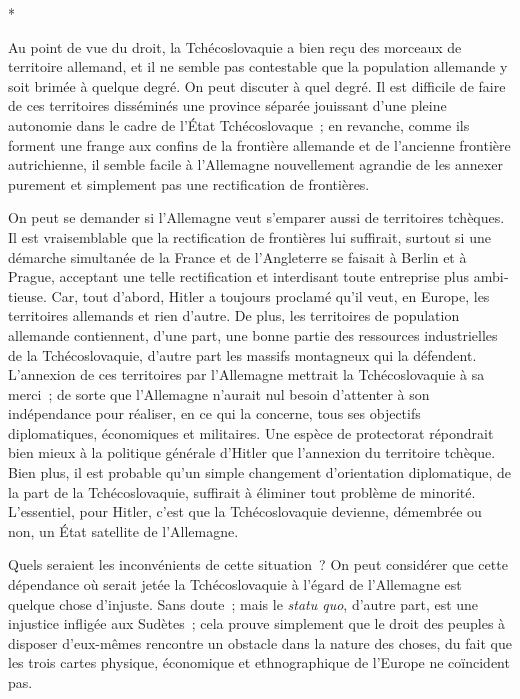 \documentclass[french,twoside]{book} %
\begin{document}
\begin{center}
*\end{center}
\noindent Au point de vue du droit, la Tchécoslovaquie a bien reçu des morceaux de territoire allemand, et il ne semble pas contestable que la population alleman­de y soit brimée à quelque degré. On peut discuter à quel degré. Il est difficile de faire de ces territoires disséminés une province séparée jouissant d'une pleine autonomie dans le cadre de l'État Tchécoslovaque ; en revanche, com­me ils forment une frange aux confins de la frontière allemande et de l'ancienne frontière autrichienne, il semble facile à l'Allemagne nouvellement agrandie de les annexer purement et simplement pas une rectification de frontières.\par
On peut se demander si l'Allemagne veut s'emparer aussi de territoires tchèques. Il est vraisemblable que la rectification de frontières lui suffirait, surtout si une démarche simultanée de la France et de l'Angleterre se faisait à Berlin et à Prague, acceptant une telle rectification et interdisant toute entre­prise plus ambi­tieuse. Car, tout d'abord, Hitler a toujours proclamé qu'il veut, en Europe, les territoires allemands et rien d'autre. De plus, les territoires de population allemande contiennent, d'une part, une bonne partie des ressources industrielles de la Tchécoslovaquie, d'autre part les massifs montagneux qui la défendent. L'annexion de ces territoires par l'Allemagne mettrait la Tchécos­lovaquie à sa merci ; de sorte que l'Allemagne n'aurait nul besoin d'attenter à son indépendance pour réaliser, en ce qui la concerne, tous ses objectifs diplomatiques, économiques et militaires. Une espèce de protectorat répon­drait bien mieux à la politique générale d'Hitler que l'annexion du territoire tchèque. Bien plus, il est probable qu'un simple changement d'orientation diplomatique, de la part de la Tchécoslovaquie, suffirait à éliminer tout pro­blème de minorité. L'essentiel, pour Hitler, c'est que la Tchécoslovaquie devienne, démembrée ou non, un État satellite de l'Allemagne.\par
Quels seraient les inconvénients de cette situation ? On peut considérer que cette dépendance où serait jetée la Tchécoslovaquie à l'égard de l'Allema­gne est quelque chose d'injuste. Sans doute ; mais le {\itshape statu quo}, d'autre part, est une injustice infligée aux Sudètes ; cela prouve simplement que le droit des peuples à disposer d'eux-mêmes rencontre un obstacle dans la nature des choses, du fait que les trois cartes physique, économique et ethnographique de l'Europe ne coïncident pas.\par
\end{document}
